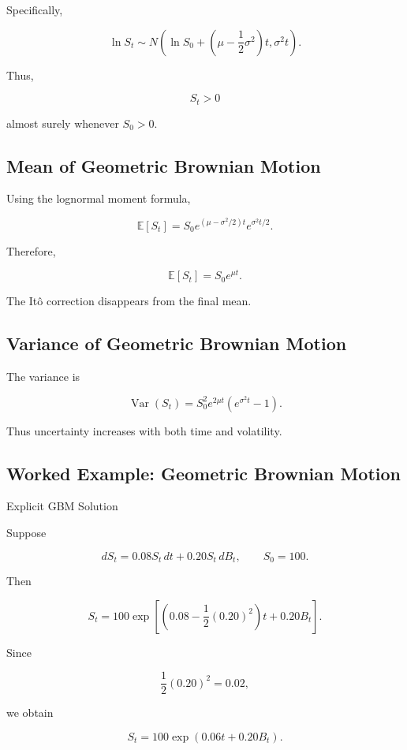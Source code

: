 Specifically,

\[
\boxed{
\ln S_t
\sim
N
\left(
\ln S_0
+
\left(
\mu-\frac12\sigma^2
\right)t,
\sigma^2t
\right).
}
\]

Thus,

\[
\boxed{
S_t>0
}
\]

almost surely whenever \(S_0>0\).

\subsection{Mean of Geometric Brownian Motion}
\label{subsec:gbm-mean}

Using the lognormal moment formula,

\[
\mathbb{E}[S_t]
=
S_0
e^{(\mu-\sigma^2/2)t}
e^{\sigma^2t/2}.
\]

Therefore,

\[
\boxed{
\mathbb{E}[S_t]
=
S_0e^{\mu t}.
}
\]

The It\^o correction disappears from the final mean.

\subsection{Variance of Geometric Brownian Motion}
\label{subsec:gbm-variance}

The variance is

\[
\boxed{
\operatorname{Var}(S_t)
=
S_0^2
e^{2\mu t}
\left(
e^{\sigma^2t}-1
\right).
}
\]

Thus uncertainty increases with both time and volatility.

\subsection{Worked Example: Geometric Brownian Motion}
\label{subsec:worked-gbm}

\begin{workedexamplebox}{Explicit GBM Solution}

Suppose

\[
dS_t
=
0.08S_t\,dt
+
0.20S_t\,dB_t,
\qquad
S_0=100.
\]

Then

\[
S_t
=
100
\exp
\left[
\left(
0.08-\frac12(0.20)^2
\right)t
+
0.20B_t
\right].
\]

Since

\[
\frac12(0.20)^2=0.02,
\]

we obtain

\begin{answerbox}
\[
\boxed{
S_t
=
100
\exp
\left(
0.06t+0.20B_t
\right).
}
\]
\end{answerbox}

\end{workedexamplebox}

